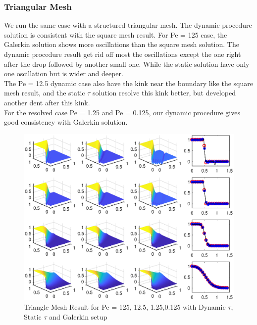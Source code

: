 \documentclass[10pt]{article}
\begin{document}
\subsubsection{Triangular Mesh}
We run the same case with a structured triangular mesh. The dynamic procedure solution is consistent with the square mesh result. For Pe = 125 case, the Galerkin solution shows more oscillations than the square mesh solution. The dynamic procedure result get rid off most the oscillations except the one right after the drop followed by another small one. While the static solution have only one oscillation but is wider and deeper. \\
The Pe = 12.5 dynamic case also have the kink near the boundary like the square mesh result, and the static $\tau$ solution resolve this kink better, but developed another dent after this kink.\\
For the resolved case Pe = 1.25 and Pe = 0.125, our dynamic procedure gives good consistency with Galerkin solution.\\
\begin{figure}[h!]
	\begin{center}
	\includegraphics[width=1.0\textwidth, clip]{./figure/TRmesh.eps}
	\end{center}
		\vspace{0mm}
    \caption{Triangle Mesh Result for Pe = 125, 12.5, 1.25,0.125 with Dynamic $\tau$, Static $\tau$ and Galerkin setup}
  	\label{Tri}
\end{figure}
\end{document}
